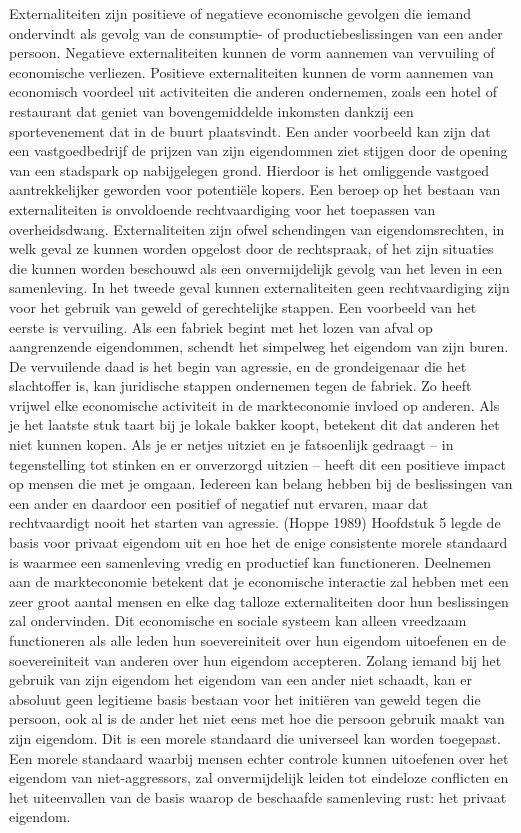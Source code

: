 \documentclass[
  a5paper,
  smalldemyvopaper,11pt,twoside,onecolumn,openright,extrafontsizes,
hidelinks]{memoir}
\begin{document}
Externaliteiten zijn positieve of negatieve economische gevolgen die
iemand ondervindt als gevolg van de consumptie- of productiebeslissingen
van een ander persoon. Negatieve externaliteiten kunnen de vorm aannemen
van vervuiling of economische verliezen. Positieve externaliteiten
kunnen de vorm aannemen van economisch voordeel uit activiteiten die
anderen ondernemen, zoals een hotel of restaurant dat geniet van
bovengemiddelde inkomsten dankzij een sportevenement dat in de buurt
plaatsvindt. Een ander voorbeeld kan zijn dat een vastgoedbedrijf de
prijzen van zijn eigendommen ziet stijgen door de opening van een
stadspark op nabijgelegen grond. Hierdoor is het omliggende vastgoed
aantrekkelijker geworden voor potentiële kopers. Een beroep op het
bestaan van externaliteiten is onvoldoende rechtvaardiging voor het
toepassen van overheidsdwang. Externaliteiten zijn ofwel schendingen van
eigendomsrechten, in welk geval ze kunnen worden opgelost door de
rechtspraak, of het zijn situaties die kunnen worden beschouwd als een
onvermijdelijk gevolg van het leven in een samenleving. In het tweede
geval kunnen externaliteiten geen rechtvaardiging zijn voor het gebruik
van geweld of gerechtelijke stappen. Een voorbeeld van het eerste is
vervuiling. Als een fabriek begint met het lozen van afval op
aangrenzende eigendommen, schendt het simpelweg het eigendom van zijn
buren. De vervuilende daad is het begin van agressie, en de
grondeigenaar die het slachtoffer is, kan juridische stappen ondernemen
tegen de fabriek. Zo heeft vrijwel elke economische activiteit in de
markteconomie invloed op anderen. Als je het laatste stuk taart bij je
lokale bakker koopt, betekent dit dat anderen het niet kunnen kopen. Als
je er netjes uitziet en je fatsoenlijk gedraagt -- in tegenstelling tot
stinken en er onverzorgd uitzien -- heeft dit een positieve impact op
mensen die met je omgaan. Iedereen kan belang hebben bij de beslissingen
van een ander en daardoor een positief of negatief nut ervaren, maar dat
rechtvaardigt nooit het starten van agressie. (Hoppe 1989) Hoofdstuk 5
legde de basis voor privaat eigendom uit en hoe het de enige consistente
morele standaard is waarmee een samenleving vredig en productief kan
functioneren. Deelnemen aan de markteconomie betekent dat je economische
interactie zal hebben met een zeer groot aantal mensen en elke dag
talloze externaliteiten door hun beslissingen zal ondervinden. Dit
economische en sociale systeem kan alleen vreedzaam functioneren als
alle leden hun soevereiniteit over hun eigendom uitoefenen en de
soevereiniteit van anderen over hun eigendom accepteren. Zolang iemand
bij het gebruik van zijn eigendom het eigendom van een ander niet
schaadt, kan er absoluut geen legitieme basis bestaan voor het initiëren
van geweld tegen die persoon, ook al is de ander het niet eens met hoe
die persoon gebruik maakt van zijn eigendom. Dit is een morele standaard
die universeel kan worden toegepast. Een morele standaard waarbij mensen
echter controle kunnen uitoefenen over het eigendom van niet-aggressors,
zal onvermijdelijk leiden tot eindeloze conflicten en het uiteenvallen
van de basis waarop de beschaafde samenleving rust: het privaat
eigendom.
\end{document}
